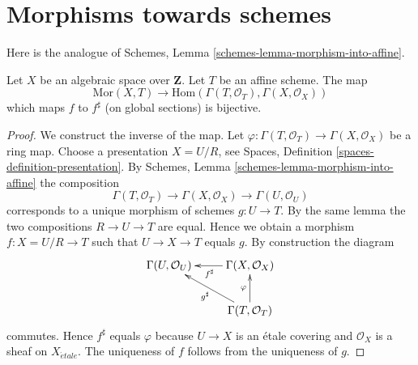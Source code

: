 \section{Morphisms towards schemes}
\label{section-morphisms-to-schemes}

\noindent
Here is the analogue of
Schemes, Lemma \ref{schemes-lemma-morphism-into-affine}.

\begin{lemma}
\label{lemma-morphism-to-affine-scheme}
Let $X$ be an algebraic space over $\mathbf{Z}$.
Let $T$ be an affine scheme.
The map
$$
\text{Mor}(X, T)
\longrightarrow
\text{Hom}(\Gamma(T, \mathcal{O}_T), \Gamma(X, \mathcal{O}_X))
$$
which maps $f$ to $f^\sharp$ (on global sections) is bijective.
\end{lemma}

\begin{proof}
We construct the inverse of the map.
Let $\varphi : \Gamma(T, \mathcal{O}_T) \to \Gamma(X, \mathcal{O}_X)$
be a ring map. Choose a presentation $X = U/R$, see
Spaces, Definition \ref{spaces-definition-presentation}.
By
Schemes, Lemma \ref{schemes-lemma-morphism-into-affine}
the composition
$$
\Gamma(T, \mathcal{O}_T) \to \Gamma(X, \mathcal{O}_X) \to
\Gamma(U, \mathcal{O}_U)
$$
corresponds to a unique morphism of schemes $g : U \to T$. By the same lemma
the two compositions $R \to U \to T$ are equal. Hence we obtain a morphism
$f : X = U/R \to T$ such that $U \to X \to T$ equals $g$. By construction
the diagram
$$
\xymatrix{
\Gamma(U, \mathcal{O}_U) & \Gamma(X, \mathcal{O}_X) \ar[l]^{f^\sharp} \\
& \Gamma(T, \mathcal{O}_T) \ar[lu]^{g^\sharp} \ar[u]^\varphi
}
$$
commutes. Hence $f^\sharp$ equals $\varphi$ because $U \to X$ is an
\'etale covering and $\mathcal{O}_X$ is a sheaf on $X_{\acute{e}tale}$.
The uniqueness of $f$ follows from the uniqueness of $g$.
\end{proof}












